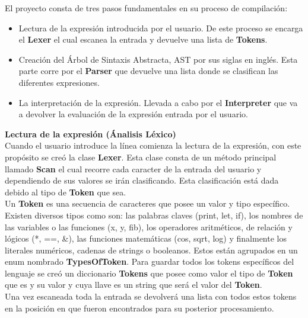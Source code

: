 \documentclass{article}
\begin{document}
\begin{flushleft}
\large{El proyecto consta de tres pasos fundamentales en su proceso de compilación:}
\begin{itemize}
 \item \large{Lectura de la expresión introducida por el usuario. De este proceso se encarga el  \textbf{ Lexer} el cual escanea la entrada y devuelve una lista de \textbf{Tokens}.}
\item \large{Creación del Árbol de Sintaxis Abstracta, AST por sus siglas en inglés. Esta parte corre por el \textbf{Parser} que devuelve una lista donde se clasifican las diferentes expresiones.}
\item \large{La interpretación de la expresión. Llevada a cabo por el  \textbf{Interpreter} que va a devolver la evaluación de la expresión entrada por el usuario.}
\end{itemize}

\Large {\textbf{Lectura de la expresión (Ánalisis Léxico)}}\linebreak \\
\large {Cuando el usuario introduce la línea comienza la lectura de la expresión, con este propósito se creó la clase \textbf{ Lexer}. Esta clase consta de un método principal llamado \textbf{Scan} el cual recorre cada  caracter de la entrada del usuario y dependiendo de sus valores se irán clasificando. Esta clasificación está dada debido al tipo de \textbf{Token} que sea.}\linebreak \\
\large {Un  \textbf{Token} es una secuencia de caracteres que posee un valor y tipo específico. Existen diversos tipos como son: las palabras claves (print, let, if), los nombres de las variables o las funciones (x, y, fib), los operadores aritméticos, de relación y lógicos (*, ==, \&), las funciones matemáticas (cos, sqrt, log) y finalmente los literales numéricos, cadenas de strings o booleanos. Estos están agrupados en un enum nombrado \textbf{TypesOfToken}. Para guardar todos los tokens específicos del lenguaje se creó un diccionario \textbf{Tokens} que posee como valor el tipo de \textbf{Token} que es y su valor y cuya llave es un string que será el valor del  \textbf{Token}.}\linebreak \\
\large {Una vez escaneada toda la entrada se devolverá una lista con todos estos tokens en la posición en que fueron encontrados para su posterior procesamiento.}\linebreak \\


\end{flushleft}
\end{document}
